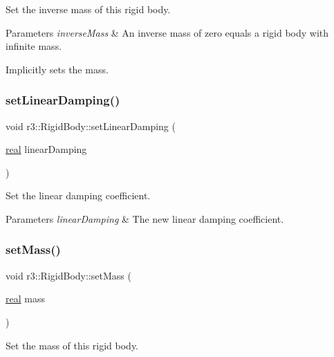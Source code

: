 Set the inverse mass of this rigid body. 


\begin{DoxyParams}{Parameters}
{\em inverse\+Mass} & An inverse mass of zero equals a rigid body with infinite mass.\\
\hline
\end{DoxyParams}
Implicitly sets the mass. \mbox{\label{classr3_1_1_rigid_body_ac65bfd9fd7a12de59141fab3c02e8579}} 
\subsubsection{\texorpdfstring{set\+Linear\+Damping()}{setLinearDamping()}}
{\footnotesize\ttfamily void r3\+::\+Rigid\+Body\+::set\+Linear\+Damping (\begin{DoxyParamCaption}\item[{\mbox{\hyperlink{namespacer3_ab2016b3e3f743fb735afce242f0dc1eb}{real}}}]{linear\+Damping }\end{DoxyParamCaption})}



Set the linear damping coefficient. 


\begin{DoxyParams}{Parameters}
{\em linear\+Damping} & The new linear damping coefficient. \\
\hline
\end{DoxyParams}
\mbox{\label{classr3_1_1_rigid_body_a84c88437d863261773c9514d87bbc56a}} 
\subsubsection{\texorpdfstring{set\+Mass()}{setMass()}}
{\footnotesize\ttfamily void r3\+::\+Rigid\+Body\+::set\+Mass (\begin{DoxyParamCaption}\item[{\mbox{\hyperlink{namespacer3_ab2016b3e3f743fb735afce242f0dc1eb}{real}}}]{mass }\end{DoxyParamCaption})}



Set the mass of this rigid body. 


